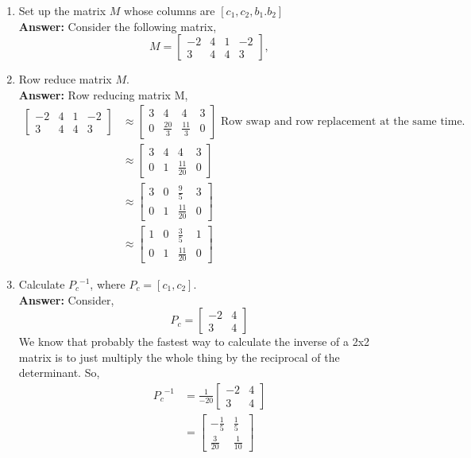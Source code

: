 \documentclass{amsart}
\begin{document}
\begin{enumerate}
\item Set up the matrix $M$ whose columns are $[c_1,c_2,b_1.b_2]$\\
\noindent \textbf{Answer: } Consider the following matrix,
\begin{equation*}
M =
\begin{bmatrix}
-2&4&1&-2\\
3&4&4&3
\end{bmatrix},
\end{equation*}
\vspace{.1in}

\item Row reduce matrix $M$.\\
\noindent \textbf{Answer: } Row reducing matrix M,
\begin{align*}
\begin{bmatrix}
-2&4&1&-2\\
3&4&4&3
\end{bmatrix}
&\approx
\begin{bmatrix}
3&4&4&3\\
0&\frac{20}{3}&\frac{11}{3}&0
\end{bmatrix} \text{ Row swap and row replacement at the same time.}\\
&\approx
\begin{bmatrix}
3&4&4&3\\
0&1&\frac{11}{20}&0
\end{bmatrix}\\
&\approx
\begin{bmatrix}3&0&\frac{9}{5}&3\\ 0&1&\frac{11}{20}&0\end{bmatrix}\\
&\approx
\begin{bmatrix}1&0&\frac{3}{5}&1\\ 0&1&\frac{11}{20}&0\end{bmatrix}
\end{align*}
\vspace{.1in}


\item Calculate ${P_c}^{-1}$, where  ${P_c} = [c_1,c_2]$.\\
\noindent \textbf{Answer: }Consider,
\begin{equation*}
{P_c} = 
\begin{bmatrix}
-2&4\\
3&4
\end{bmatrix}
\end{equation*}
We know that probably the fastest way to calculate the inverse of a 2x2 matrix is to just multiply the whole thing by the reciprocal of the determinant. So,
\begin{align*}
{P_c}^{-1} &= \frac{1}{-20}
\begin{bmatrix}
-2&4\\
3&4
\end{bmatrix}\\
&= \begin{bmatrix}-\frac{1}{5}&\frac{1}{5}\\ \frac{3}{20}&\frac{1}{10}\end{bmatrix}
\end{align*}


\end{enumerate}
\end{document}
